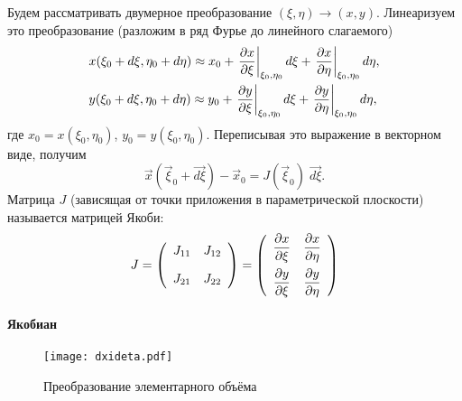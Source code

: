 Будем рассматривать двумерное преобразование $(\xi, \eta) \to (x, y)$.
Линеаризуем это преобразование (разложим в ряд Фурье до линейного слагаемого)
\begin{align*}
& x(\xi_0 + d\xi, \eta_0 + d\eta) \approx x_0 + \left.\frac{\partial x}{\partial \xi}\right|_{\xi_0, \eta_0} d\xi
    + \left.\frac{\partial x}{\partial \eta}\right|_{\xi_0, \eta_0} d\eta, \\
& y(\xi_0 + d\xi, \eta_0 + d\eta) \approx y_0 + \left.\frac{\partial y}{\partial \xi}\right|_{\xi_0, \eta_0} d\xi
    + \left.\frac{\partial y}{\partial \eta}\right|_{\xi_0, \eta_0} d\eta,
\end{align*}
где $x_0 = x(\xi_0, \eta_0)$, $y_0 = y(\xi_0, \eta_0)$.
Переписывая это выражение в векторном виде, получим
\begin{equation}
\label{eq:jacobi_linear}
\vec{x}(\vec \xi_0 + \vec{d\xi} ) - \vec{x}_0 = J(\vec \xi_0) \; \vec{d\xi}.
\end{equation}
Матрица $J$ (зависящая от точки приложения в параметрической плоскости) называется матрицей Якоби:
\begin{equation}
\label{eq:jacobi_matrix_2d}
J = \left(
	\begin{array}{cc}
	J_{11} & J_{12}\\[10pt]
	J_{21} & J_{22}\\
	\end{array}
\right)
= \left(
	\begin{array}{cc}
	\dfrac{\partial x}{\partial \xi} & \dfrac{\partial x}{\partial \eta}\\[10pt]
	\dfrac{\partial y}{\partial \xi} & \dfrac{\partial y}{\partial \eta}\\
	\end{array}
\right)
\end{equation}

\paragraph{Якобиан}

\begin{figure}[h!]
\centering
\texttt{[image: dxideta.pdf]}
\caption{Преобразование элементарного объёма}
\label{fig:dxideta}
\end{figure}

